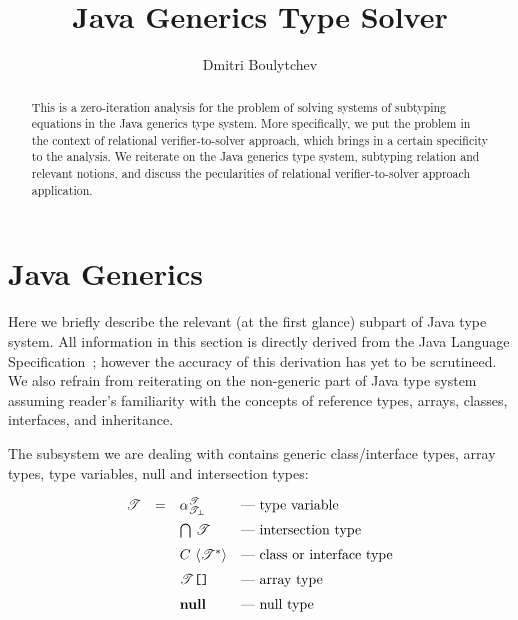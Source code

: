 \documentclass{article}
\newcommand{\grc}[2]{{#1}\,\left<{#2}\right>}
\newcommand{\java}[1]{\texttt{#1}}
\newcommand{\primi}[1]{\mathbf{#1}}
\begin{document}
\title{Java Generics Type Solver}

\author{Dmitri Boulytchev}

\maketitle

\begin{abstract}
  This is a zero-iteration analysis for the problem of solving systems of subtyping
  equations in the Java generics type system. More specifically, we put the
  problem in the context of relational verifier-to-solver approach, which brings in a certain
  specificity to the analysis. We reiterate on the Java generics type system, subtyping
  relation and relevant notions, and discuss the pecularities of relational verifier-to-solver
  approach application. %
\end{abstract}

\section{Java Generics}

Here we briefly describe the relevant (at the first glance) subpart of Java type system. All
information in this section is directly derived from the Java Language Specification~\cite{JLS};
however the accuracy of this derivation has yet to be scrutineed. We also refrain from
reiterating on the non-generic part of Java type system assuming reader's familiarity with the
concepts of reference types, arrays, classes, interfaces, and inheritance.

The subsystem we are dealing with contains generic class/interface types, array types,
type variables, null and intersection types:

\[
\begin{array}{rcll}
  \mathscr{T} & = & \alpha^\mathscr{T}_\mathscr{T_\bot}&\mbox{--- type variable}\\[2mm]
              &   & \bigcap\,\mathscr{T}           &\mbox{--- intersection type}\\[2mm]
              &   & \grc{C}{\mathscr{T}^*}         &\mbox{--- class or interface type}\\[2mm]
              &   & \mathscr{T}\mbox{\java{[]}}    &\mbox{--- array type}\\[2mm]
              &   & \primi{null}                   &\mbox{--- null type}\\[2mm]
\end{array}
\]
\end{document}
